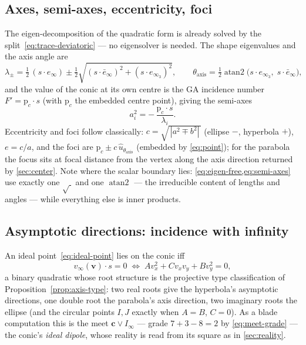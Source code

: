\documentclass{birkjour}
\theoremstyle{definition}
\theoremstyle{remark}
\newcommand{\einf}{e_\infty}
\newcommand{\einfbar}{\bar e_\infty}
\newcommand{\Iinf}{I_\infty}
\newcommand{\meet}{\vee}
\begin{document}
\subsection{Axes, semi-axes, eccentricity, foci}
\label{sec:axes}
The eigen-decomposition of the quadratic form is already solved by the
split~\eqref{eq:trace-deviatoric} --- no eigensolver is needed. The shape
eigenvalues and the axis angle are
\begin{equation}\label{eq:eigen-free}
  \lambda_\pm=\tfrac12\,(s\!\cdot\einf)
  \pm\tfrac12\sqrt{(s\!\cdot\einfbar)^2+(s\!\cdot e_{\infty_3})^2},
  \qquad
  \theta_{\text{axis}}=\tfrac12\operatorname{atan2}\!\big(s\!\cdot e_{\infty_3},\;
  s\!\cdot\einfbar\big),
\end{equation}
and the value of the conic at its own centre is the GA incidence number
$F' = \mathrm{p}_c\!\cdot s$ (with $\mathrm{p}_c$ the embedded centre point),
giving the semi-axes
\begin{equation}\label{eq:semi-axes}
  a_i^2 = -\,\frac{\mathrm{p}_c\!\cdot s}{\lambda_i} .
\end{equation}
Eccentricity and foci follow classically: $c=\sqrt{\,|a^2\mp b^2|\,}$
(ellipse $-$, hyperbola $+$), $e=c/a$, and the foci are
$\mathrm{p}_c \pm c\,\hat u_{\theta_{\text{axis}}}$ (embedded by
\cref{eq:point}); for the parabola the focus sits at focal distance from the
vertex along the axis direction returned by \cref{sec:center}. Note where the
scalar boundary lies: \cref{eq:eigen-free,eq:semi-axes} use exactly one
$\sqrt{\ }$ and one $\operatorname{atan2}$ --- the irreducible content of
lengths and angles --- while everything else is inner products.

\subsection{Asymptotic directions: incidence with infinity}
\label{sec:asymptotes}
An ideal point~\eqref{eq:ideal-point} lies on the conic iff
\begin{equation}\label{eq:asymptote}
  v_\infty(\mathbf{v})\cdot s = 0
  \;\iff\;
  A v_x^2 + C v_x v_y + B v_y^2 = 0 ,
\end{equation}
a binary quadratic whose root structure is the projective type
classification of Proposition~\ref{prop:axis-type}: two real roots give the hyperbola's
asymptotic directions, one double root the parabola's axis direction, two
imaginary roots the ellipse (and the circular points $I,J$ exactly when
$A=B$, $C=0$). As a blade computation this is the meet
$\mathbf{c}\meet\Iinf$ --- grade $7+3-8=2$ by \cref{eq:meet-grade} --- the
conic's \emph{ideal dipole}, whose reality is read from its square as in
\cref{sec:reality}.
\end{document}
